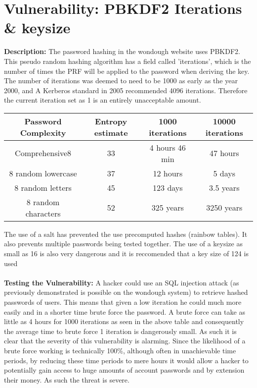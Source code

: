 \section{Vulnerability: PBKDF2 Iterations \& keysize}
\label{sec:background}
\textbf{Description:} The password hashing in the wondough website uses PBKDF2. This pseudo random hashing algorithm has a field called 'iterations', which is the number of times
the PRF will be applied to the password when deriving the key. The number of iterations was deemed to need to be 1000 as early as the year 2000, and A Kerberos standard in 2005 recommended
4096 iterations. Therefore the current iteration set as 1 is an entirely unacceptable amount\cite{Cyrptosense2015}.\begin{center}
   \begin{tabular}{ |c|c|c|c| }
    \hline
    Password Complexity & Entropy estimate & 1000 iterations &  10000 iterations\\
    \hline
    Comprehensive8 & 33 & 4 hours 46 min & 47 hours \\
    8 random lowercase & 37 & 12 hours & 5 days \\
    8 random letters & 45 & 123 days & 3.5 years \\
    8 random characters & 52 & 325 years & 3250 years \\
    \hline
   \end{tabular}
   \end{center}
The use of a salt has prevented the use precomputed hashes (rainbow tables). It also prevents multiple passwords being tested together. The use of a keysize
as small as 16 is also very dangerous and it is reccomended that a key size of 124 is used \cite{keysize}\\ \\
\textbf{Testing the Vulnerability:} A hacker could use an SQL injection attack (as previously demonstrated is possible on the wondough system) to retrieve hashed passwords of
users. This means that given a low iteration he could much more easily and in a shorter time brute force the password. A brute force can take as little as 4 hours for 1000
iterations as seen in the above table and consequently the average time to brute force 1 iteration is dangerously small. As such it is clear that the severity of this vulnerability
is alarming. Since the likelihood of a brute force working is technically 100\%, although often in unachievable time periods, by reducing these time periods to mere hours it
would allow a hacker to potentially gain access to huge amounts of account passwords and by extension their money. As such the threat is severe. \\ \\
